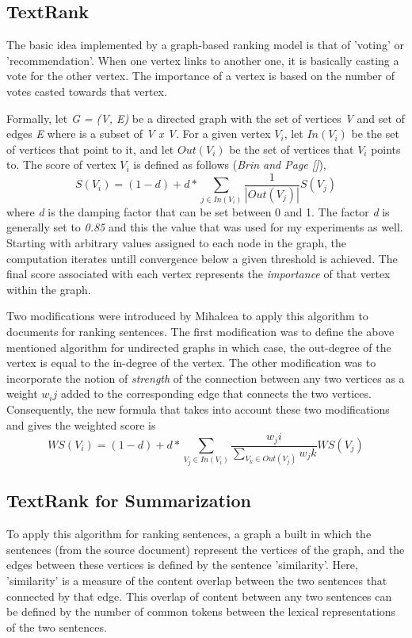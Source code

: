 \subsection{TextRank}
The basic idea implemented by a graph-based ranking model is that of 'voting' or 'recommendation'.
When one vertex links to another one, it is basically casting a vote for the other vertex.
The importance of a vertex is based on the number of votes casted towards that vertex. 

Formally, let \emph{G = (V, E)} be a directed graph with the set of vertices \emph{V} and set of edges \emph{E} where is a subset of \emph{{V x V}}.
For a given vertex \(V_i\), let \(In(V_i)\) be the set of vertices that point to it, and let \(Out(V_i)\) be the set of vertices that \(V_i\) points to.
The score of vertex \(V_i\) is defined as follows (\emph{Brin and Page []}),
\[S(V_i) = (1 - d) + d * \sum_{j \in In(V_i)} \frac{1}{|Out(V_j)|}S(V_j)\]
where \emph{d} is the damping factor that can be set between 0 and 1.
The factor \emph{d} is generally set to \emph{0.85} and this the value that was used for my experiments as well.
Starting with arbitrary values assigned to each node in the graph, the computation iterates untill convergence below a given threshold is achieved.
The final score associated with each vertex represents the \textit{importance} of that vertex within the graph.

Two modifications were introduced by Mihalcea \cite{mihalcea-tarau:2004:EMNLP} to apply this algorithm to documents for ranking sentences.
The first modification was to define the above mentioned algorithm for undirected graphs in which case, the out-degree of the vertex is equal to the in-degree of the vertex.
The other modification was to incorporate the notion of \textit{strength} of the connection between any two vertices as a weight \(w_ij\) added to the corresponding edge that connects the two vertices.
Consequently, the new formula that takes into account these two modifications and gives the weighted score is
\[WS(V_i) = (1 - d) + d * \sum_{V_j \in In(V_i)} \frac{w_ji}{\sum_{V_k \in Out(V_j)}w_jk}WS(V_j)\]

\subsection{TextRank for Summarization}
To apply this algorithm for ranking sentences, a graph a built in which the sentences (from the source document) represent the vertices of the graph, and the edges between these vertices is defined by the sentence 'similarity'.
Here, 'similarity' is a measure of the content overlap between the two sentences that connected by that edge.
This overlap of content between any two sentences can be defined by the number of common tokens between the lexical representations of the two sentences.

